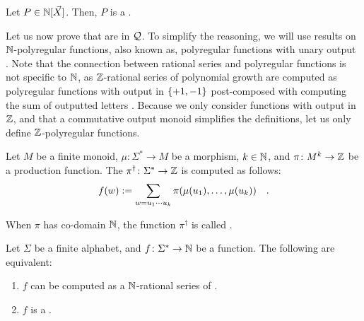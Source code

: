 \documentclass[a4paper,11pt]{article}
\begin{document}
\begin{fact}
    \label{fact:n-poly-n-poly}
    Let $P \in \mathbb{N}[\vec{X}]$. Then, $P$
    is a .
\end{fact}

Let us now prove that  are in $\mathcal{Q}$.
To simplify the reasoning, we will use results on $\mathbb{N}$-polyregular functions,
also known as, polyregular functions with unary output
\cite{doueneau2021pebble,bojanczyk2019string}. Note that the connection between
rational series and polyregular functions is not specific to $\mathbb{N}$, as
$\mathbb{Z}$-rational series of polynomial growth are computed as polyregular
functions with output in $\mathopen{\{} +1,-1 \mathclose{\}}$ post-composed with computing the sum of
outputted letters \cite{LOPEZ23b}. Because we only consider functions with
output in $\mathbb{Z}$, and that a commutative output monoid simplifies the definitions,
let us only define $\mathbb{Z}$-polyregular functions.


\begin{definition}
    Let $M$ be a finite monoid, $\mu \colon \Sigma^* \to M$
    be a morphism, $k \in \mathbb{N}$, and 
    $\pi \colon M^k \to \mathbb{Z}$ be a production function.
    The 
    $\pi^\dagger \colon \Sigma^* \to \mathbb{Z}$
    is computed as follows:
    \begin{equation*}
        f(w) \mathrel{:=}
        \sum_{w = u_1 \cdots u_k} \pi(\mu(u_1), \dots, \mu(u_k))
        \quad .
    \end{equation*}

    When $\pi$ has co-domain $\mathbb{N}$, the function $\pi^\dagger$
    is called .
\end{definition}

\begin{fact}[see e.g. ...]
    \label{polynomial-rational-polyreg:fact}
    Let $\Sigma$ be a finite alphabet, and $f \colon \Sigma^* \to \mathbb{N}$
    be a function. The following are equivalent:
    \begin{enumerate}
        \item $f$ can be computed as a \k{$\mathbb{N}$-rational series}
            of .
        \item $f$ is a .
    \end{enumerate}
\end{fact}
\end{document}
